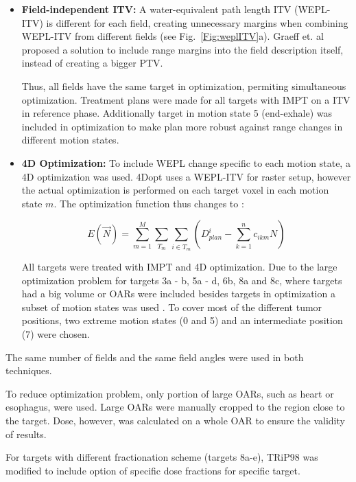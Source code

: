 \begin{itemize}
\item \textbf{Field-independent ITV:} A water-equivalent path length ITV (WEPL-ITV) is different for each field, creating unnecessary margins when combining 
WEPL-ITV from different fields (see Fig.~\ref{Fig:weplITV}a). 
Graeff et. al \cite{Graeff2012} proposed a solution to include range margins into the field description itself, instead of creating a bigger PTV. 

Thus, all fields have the same target in optimization, permiting simultaneous optimization. 
Treatment plans were made for all targets with IMPT on a ITV in reference phase. Additionally target in motion state 5 (end-exhale) was included in optimization
to make plan more robust against range changes in different motion states.

\item \textbf{4D Optimization:} To include WEPL change specific to each motion state, a 4D optimization was used. 4Dopt uses a WEPL-ITV for raster setup, 
however the actual optimization is performed on each target voxel in each motion state $m$. The optimization function thus changes to \cite{Graeff2012}:

\begin{equation}
E(\vec{N}) = \sum_{m=1}^{M}\sum_{T_m} \sum_{i\in T_m} \left( D_{plan}^{i} -\sum_{k=1}^n c_{ikm}N\right)
\end{equation}

All targets were treated with IMPT and 4D optimization. Due to the large optimization problem for targets 3a - b, 5a - d, 6b, 8a and 8c, where targets had a big volume or 
OARs were included besides targets in optimization a subset of motion states was used \cite{Graeff2012}. 
To cover most of the different tumor positions, two extreme motion states (0 and 5) and an intermediate position (7) were chosen.

\end{itemize}

The same number of fields and the same field angles were used in both techniques.

To reduce optimization problem, only portion of large OARs, such as heart or esophagus, were used. Large OARs were manually cropped to the region close to the 
target. Dose, however, was calculated on a whole OAR to ensure the validity of results.

For targets with different fractionation scheme (targets 8a-e), TRiP98 was modified to include option of specific dose fractions for specific target.


